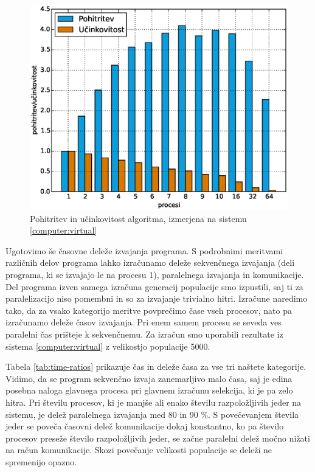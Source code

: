 \documentclass[a4paper,12pt]{book}
\begin{document}
\begin{figure}
	\centering
	\includegraphics[scale=0.6]{res/speedup-efficiency.eps}
	\caption{Pohitritev in učinkovitost algoritma, izmerjena na sistemu \ref{computer:virtual}}
	\label{pic:speedup-efficiency}
\end{figure}

Ugotovimo še časovne deleže izvajanja programa. S podrobnimi meritvami različnih delov programa lahko izračunamo deleže sekvenčnega izvajanja (deli programa, ki se izvajajo le na procesu 1), paralelnega izvajanja in komunikacije. Del programa izven samega izračuna generacij populacije smo izpustili, saj ti za paralelizacijo niso pomembni in so za izvajanje trivialno hitri. Izračune naredimo tako, da za vsako kategorijo meritve povprečimo čase vseh procesov, nato pa izračunamo deleže časov izvajanja. Pri enem samem procesu se seveda ves paralelni čas prišteje k sekvenčnemu. Za izračun smo uporabili rezultate iz sistema \ref{computer:virtual} z velikostjo populacije 5000. 

Tabela \ref{tab:time-ratios} prikazuje čas in deleže časa za vse tri naštete kategorije. Vidimo, da se program sekvenčno izvaja zanemarljivo malo časa, saj je edina posebna naloga glavnega procesa pri glavnem izračunu selekcija, ki je pa zelo hitra. Pri številu procesov, ki je manjše ali enako številu razpoložljivih jeder na sistemu, je delež paralelnega izvajanja med 80 in 90 \%. S povečevanjem števila jeder se poveča časovni delež komunikacije dokaj konstantno, ko pa število procesov preseže število razpoložljivih jeder, se začne paralelni delež močno nižati na račun komunikacije. Skozi povečanje velikosti populacije se deleži ne spremenijo opazno. 
\end{document}
